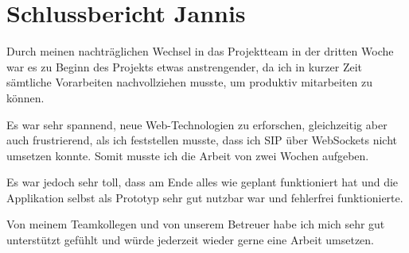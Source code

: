 \section{Schlussbericht Jannis}

Durch meinen nachträglichen Wechsel in das Projektteam in der dritten Woche war
es zu Beginn des Projekts etwas anstrengender, da ich in kurzer Zeit sämtliche
Vorarbeiten nachvollziehen musste, um produktiv mitarbeiten zu können.

Es war sehr spannend, neue Web-Technologien zu erforschen, gleichzeitig aber
auch frustrierend, als ich feststellen musste, dass ich SIP über WebSockets
nicht umsetzen konnte. Somit musste ich die Arbeit von zwei Wochen aufgeben.

Es war jedoch sehr toll, dass am Ende alles wie geplant funktioniert hat und die
Applikation selbst als Prototyp sehr gut nutzbar war und fehlerfrei
funktionierte.

Von meinem Teamkollegen und von unserem Betreuer habe ich mich sehr gut
unterstützt gefühlt und würde jederzeit wieder gerne eine Arbeit umsetzen.
